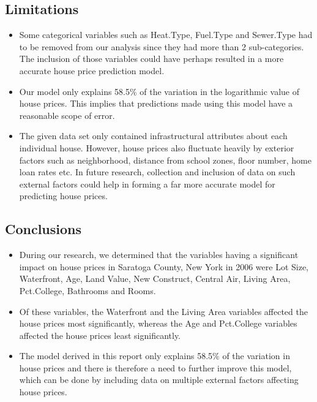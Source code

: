 \documentclass[letterpaper,9pt,twocolumn,twoside,]{pinp}
\providecommand{\tightlist}{%
  \setlength{\itemsep}{0pt}\setlength{\parskip}{0pt}}
\begin{document}
\hypertarget{limitations}{%
\subsection{Limitations}\label{limitations}}

\begin{itemize}
\tightlist
\item
  Some categorical variables such as Heat.Type, Fuel.Type and Sewer.Type
  had to be removed from our analysis since they had more than 2
  sub-categories. The inclusion of those variables could have perhaps
  resulted in a more accurate house price prediction model.
\item
  Our model only explains 58.5\% of the variation in the logarithmic
  value of house prices. This implies that predictions made using this
  model have a reasonable scope of error.
\item
  The given data set only contained infrastructural attributes about
  each individual house. However, house prices also fluctuate heavily by
  exterior factors such as neighborhood, distance from school zones,
  floor number, home loan rates etc. In future research, collection and
  inclusion of data on such external factors could help in forming a far
  more accurate model for predicting house prices.
\end{itemize}

\hypertarget{conclusions}{%
\subsection{Conclusions}\label{conclusions}}

\begin{itemize}
\item
  During our research, we determined that the variables having a
  significant impact on house prices in Saratoga County, New York in
  2006 were Lot Size, Waterfront, Age, Land Value, New Construct,
  Central Air, Living Area, Pct.College, Bathrooms and Rooms.
\item
  Of these variables, the Waterfront and the Living Area variables
  affected the house prices most significantly, whereas the Age and
  Pct.College variables affected the house prices least significantly.
\item
  The model derived in this report only explains 58.5\% of the variation
  in house prices and there is therefore a need to further improve this
  model, which can be done by including data on multiple external
  factors affecting house prices.
\end{itemize}
\end{document}
